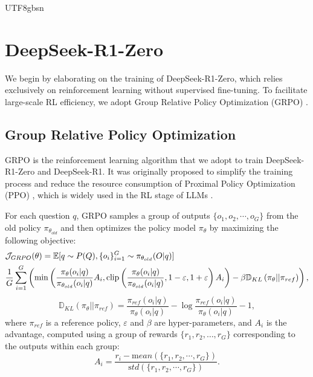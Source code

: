 \documentclass[11pt, a4paper, logo, copyright, nonumbering]{deepseek}
\renewcommand{\epsilon}{\varepsilon}
\begin{document}
\begin{CJK*}{UTF8}{gbsn}
\section{ DeepSeek-R1-Zero}

\label{sec:ds-zero}
We begin by elaborating on the training of DeepSeek-R1-Zero, which relies exclusively on reinforcement learning without supervised fine-tuning. To facilitate large-scale RL efficiency, we adopt Group Relative Policy Optimization (GRPO) \citep{deepseekmath}.

\subsection{Group Relative Policy Optimization} \label{method:grpo}
GRPO \citep{deepseekmath} is the reinforcement learning algorithm that we adopt to train DeepSeek-R1-Zero and DeepSeek-R1. It was originally proposed to simplify the training process and reduce the resource consumption of Proximal Policy Optimization (PPO) \citep{schulman2017proximal}, which is widely used in the RL stage of LLMs \citep{ouyang2022training}. 

For each question $q$, GRPO samples a group of outputs $\{o_1, o_2, \cdots, o_G\}$ from the old policy $\pi_{\theta_{old}}$ and then optimizes the policy model $\pi_{\theta}$ by maximizing the following objective:
\begin{equation}
\begin{split}
    \footnotesize
    & \mathcal{J}_{GRPO}(\theta) = \mathbb{E}{[q \sim P(Q), \{o_i\}_{i=1}^G \sim \pi_{\theta_{old}}(O|q)]}  \\
    & \frac{1}{G}\sum_{i=1}^G \left( \min \left( \frac{\pi_\theta(o_i |q)}{\pi_{\theta_{old}}(o_i |q)} A_i, \text{clip} \left( \frac{\pi_\theta(o_i |q)}{\pi_{\theta_{old}}(o_i |q)}, 1 - \epsilon, 1 + \epsilon \right)  A_i \right) - \beta \mathbb{D}_{KL}\left(\pi_{\theta} || \pi_{ref}\right)\right) ,
\end{split}
\label{eq:GRPO-obj}
\end{equation}
\begin{equation}
    \mathbb{D}_{KL}\left(\pi_{\theta} || \pi_{ref}\right) = \frac{\pi_{ref}(o_i|q)}{\pi_{\theta}(o_i|q)}- \log\frac{\pi_{ref}(o_i|q)}{\pi_{\theta}(o_i|q)} - 1,
\end{equation}
where $\pi_{ref}$ is a reference policy, $\epsilon$ and $\beta$ are hyper-parameters, and $A_i$ is the advantage, computed using a group of rewards $\{r_1, r_2, \ldots, r_G\}$ corresponding to the outputs within each group:
\begin{equation}
    A_i = \frac{r_i - {\mathrm mean(\{r_1, r_2, \cdots, r_G\})}}{{\mathrm std(\{r_1, r_2, \cdots, r_G\})}}.
\end{equation}


\end{CJK*}
\end{document}
